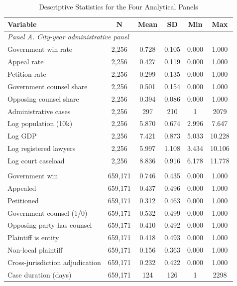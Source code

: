 \begin{table}[!htbp]
\setlength{\abovecaptionskip}{0pt}
\centering
\caption{Descriptive Statistics for the Four Analytical Panels}
\label{tab:summary_statistics_appendix}
\begin{threeparttable}
\begin{tabular}{lccccc}
\toprule
Variable & N & Mean & SD & Min & Max \\
\midrule
\multicolumn{6}{l}{\textit{Panel A. City-year administrative panel}} \\
Government win rate & 2,256 & 0.728 & 0.105 & 0.000 & 1.000 \\
Appeal rate & 2,256 & 0.427 & 0.119 & 0.000 & 1.000 \\
Petition rate & 2,256 & 0.299 & 0.135 & 0.000 & 1.000 \\
Government counsel share & 2,256 & 0.501 & 0.154 & 0.000 & 1.000 \\
Opposing counsel share & 2,256 & 0.394 & 0.086 & 0.000 & 1.000 \\
Administrative cases & 2,256 & 297 & 210 & 1 & 2079 \\
Log population (10k) & 2,256 & 5.870 & 0.674 & 2.996 & 7.647 \\
Log GDP & 2,256 & 7.421 & 0.873 & 5.033 & 10.228 \\
Log registered lawyers & 2,256 & 5.997 & 1.108 & 3.434 & 10.106 \\
Log court caseload & 2,256 & 8.836 & 0.916 & 6.178 & 11.778 \\
\addlinespace
\multicolumn{6}{l}{\textit{Panel B. Administrative case-level panel}} \\
Government win & 659,171 & 0.746 & 0.435 & 0.000 & 1.000 \\
Appealed & 659,171 & 0.437 & 0.496 & 0.000 & 1.000 \\
Petitioned & 659,171 & 0.312 & 0.463 & 0.000 & 1.000 \\
Government counsel (1/0) & 659,171 & 0.532 & 0.499 & 0.000 & 1.000 \\
Opposing party has counsel & 659,171 & 0.410 & 0.492 & 0.000 & 1.000 \\
Plaintiff is entity & 659,171 & 0.418 & 0.493 & 0.000 & 1.000 \\
Non-local plaintiff & 659,171 & 0.156 & 0.363 & 0.000 & 1.000 \\
Cross-jurisdiction adjudication & 659,171 & 0.232 & 0.422 & 0.000 & 1.000 \\
Case duration (days) & 659,171 & 124 & 126 & 1 & 2298 \\

\end{tabular}
\end{threeparttable}
\end{table}
